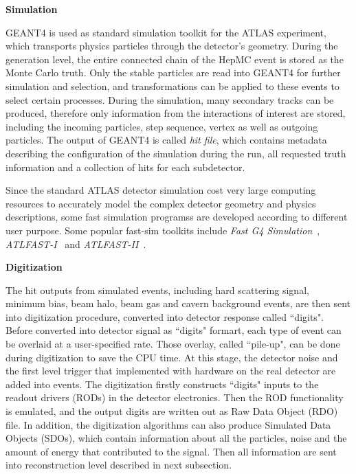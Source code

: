 \textbf{Simulation}

GEANT4 is used as standard simulation toolkit for the ATLAS experiment, which transports physics particles through the detector's geometry.
During the generation level, the entire connected chain of the HepMC event is stored as the Monte Carlo truth. 
Only the stable particles are read into GEANT4 for further simulation and selection, and transformations can be applied to these events to select certain processes.
During the simulation, many secondary tracks can be produced, therefore only information from the interactions of interest are stored, including the incoming particles, step sequence, vertex as well as outgoing particles.
The output of GEANT4 is called \textit{hit file}, which contains metadata describing the configuration of the simulation during the run, all requested truth information and a collection of hits for each subdetector.

Since the standard ATLAS detector simulation cost very large computing resources to accurately model the complex detector geometry and physics descriptions, some fast simulation programss are developed according to different user purpose.
Some popular fast-sim toolkits include \textit{Fast G4 Simulation}~\cite{Barberio:2007gba}, \textit{ATLFAST-I}~\cite{Richter-Was:683751} and \textit{ATLFAST-II}~\cite{Edmonds:1091969}.

\textbf{Digitization}

The hit outputs from simulated events, including hard scattering signal, minimum bias, beam halo, beam gas and cavern background events, are then sent into digitization procedure, converted into detector response called ``digits".
Before converted into detector signal as ``digits" formart, each type of event can be overlaid at a user-specified rate.
Those overlay, called ``pile-up", can be done during digitization to save the CPU time.
At this stage, the detector noise and the first level trigger that implemented with hardware on the real detector are added into events.
The digitization firstly constructs ``digits" inputs to the readout drivers (RODs) in the detector electronics.
Then the ROD functionality is emulated, and the output digits are written out as Raw Data Object (RDO) file.
In addition, the digitization algorithms can also produce Simulated Data Objects (SDOs), which contain information about all the particles, noise and the amount of energy that contributed to the signal. 
Then all information are sent into reconstruction level described in next subsection.

